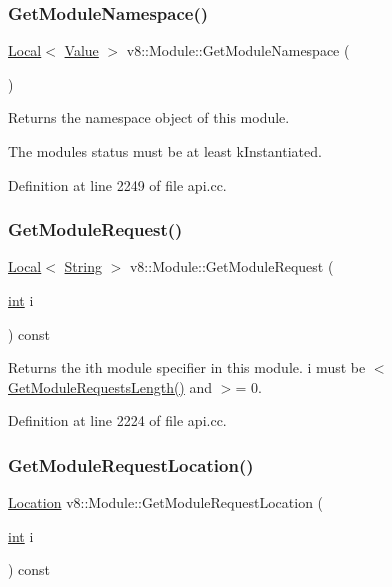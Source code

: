 \subsubsection{\texorpdfstring{Get\+Module\+Namespace()}{GetModuleNamespace()}}
{\footnotesize\ttfamily \mbox{\hyperlink{classv8_1_1Local}{Local}}$<$ \mbox{\hyperlink{classv8_1_1Value}{Value}} $>$ v8\+::\+Module\+::\+Get\+Module\+Namespace (\begin{DoxyParamCaption}{ }\end{DoxyParamCaption})}

Returns the namespace object of this module.

The module\textquotesingle{}s status must be at least k\+Instantiated. 

Definition at line 2249 of file api.\+cc.

\mbox{\label{classv8_1_1Module_adf5a972aa2f814aea5be455ea1076367}} 
\subsubsection{\texorpdfstring{Get\+Module\+Request()}{GetModuleRequest()}}
{\footnotesize\ttfamily \mbox{\hyperlink{classv8_1_1Local}{Local}}$<$ \mbox{\hyperlink{classv8_1_1String}{String}} $>$ v8\+::\+Module\+::\+Get\+Module\+Request (\begin{DoxyParamCaption}\item[{\mbox{\hyperlink{classint}{int}}}]{i }\end{DoxyParamCaption}) const}

Returns the ith module specifier in this module. i must be $<$ \mbox{\hyperlink{classv8_1_1Module_a323acfb19889ba4e16b81f1c3d89c2b9}{Get\+Module\+Requests\+Length()}} and $>$= 0. 

Definition at line 2224 of file api.\+cc.

\mbox{\label{classv8_1_1Module_a95b5467ac9bcfc120470b6944c7da111}} 
\subsubsection{\texorpdfstring{Get\+Module\+Request\+Location()}{GetModuleRequestLocation()}}
{\footnotesize\ttfamily \mbox{\hyperlink{classv8_1_1Location}{Location}} v8\+::\+Module\+::\+Get\+Module\+Request\+Location (\begin{DoxyParamCaption}\item[{\mbox{\hyperlink{classint}{int}}}]{i }\end{DoxyParamCaption}) const}

